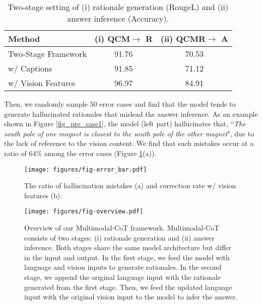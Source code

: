 \documentclass[nohyperref]{article}
\theoremstyle{plain}
\theoremstyle{definition}
\theoremstyle{remark}
\begin{document}
\begin{table}[htb]
\vspace{-3.6mm}
    \centering\small
        \caption{{Two-stage} setting of (i) rationale generation (RougeL) and (ii) answer inference (Accuracy). \label{tab:pre_decoupled}}
\begin{tabular}{lcc}\toprule
 {Method} & {(i) QCM$ \rightarrow$ R}  & {(ii) QCMR$ \rightarrow$ A}  \\\midrule
 Two-Stage Framework & 91.76 & 70.53 \\
 \midrule
 \quad w/ Captions & 91.85 & 71.12 \\
 \quad w/ Vision Features & 96.97 &	84.91 \\
\bottomrule
\end{tabular}
\end{table}

 

Then, we randomly sample 50 error cases and find that the model tends to generate hallucinated rationales that mislead the answer inference. As an example shown in Figure \ref{fig_pre_case1}, the model (left part) hallucinates that, ``\textit{The south pole of one magnet is closest to the south pole of the other magnet}", due to the lack of reference to the vision content. 
We find that such mistakes occur at a ratio of 64\% among the error cases (Figure \ref{fig_bar}(a)).






\begin{figure}[t]
  \begin{center}
   \texttt{[image: figures/fig-error\_bar.pdf]}
  \end{center}
  \vspace{-3.6mm}
  \caption{The ratio of hallucination mistakes (a) and correction rate w/ vision features (b).}
    \vspace{-3mm}
  \label{fig_bar}
\end{figure}


\begin{figure*}[htb]
  \begin{center}
\texttt{[image: figures/fig-overview.pdf]}
  \end{center}
  \vspace{-3mm}
  \caption{Overview of our Multimodal-CoT framework. Multimodal-CoT consists of two stages: (i) rationale generation and (ii) answer inference. Both stages share the same model architecture but differ in the input and output. In the first stage, we feed the model with language and vision inputs to generate rationales. In the second stage, we append the original language input with the rationale generated from the first stage. Then, we feed the updated language input with the original vision input to the model to infer the answer.}
  \label{fig_overview}
  \vspace{-3mm}
\end{figure*}
\end{document}
